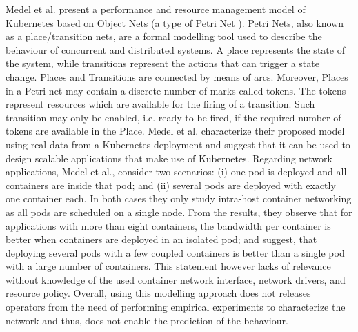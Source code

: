 \documentclass[conference]{IEEEtran}
\begin{document}
Medel et al. \cite{UCC_2016:Medel} present a performance and resource management model of Kubernetes based on Object Nets \cite{ObjectNets} (a type of Petri Net \cite{PetriNets}). Petri Nets, also known as a place/transition nets, are a formal modelling tool used to describe the behaviour of concurrent and distributed systems. A place represents the state of the system, while transitions represent the actions that can trigger a state change. Places and Transitions are connected by means of arcs. Moreover, Places in a Petri net may contain a discrete number of marks called tokens. The tokens represent resources which are available for the firing of a transition. Such transition may only be enabled, i.e. ready to be fired, if the required number of tokens are available in the Place. Medel et al. characterize their proposed model using real data from a Kubernetes deployment and suggest that it can be used to design scalable applications that make use of Kubernetes. Regarding network applications, Medel et al., consider two scenarios: (i) one pod is deployed and all containers are inside that pod; and (ii) several pods are deployed with exactly one container each. In both cases they only study intra-host container networking as all pods are scheduled on a single node. From the results, they observe that for applications with more than eight containers, the bandwidth per container is better when containers are deployed in an isolated pod; and suggest, that deploying several pods with a few coupled containers is better than a single pod with a large number of containers. This statement however lacks of relevance without knowledge of the used container network interface, network drivers, and resource policy. Overall, using this modelling approach does not releases operators from the need of performing empirical experiments to characterize the network and thus, does not enable the prediction of the behaviour.
\end{document}
